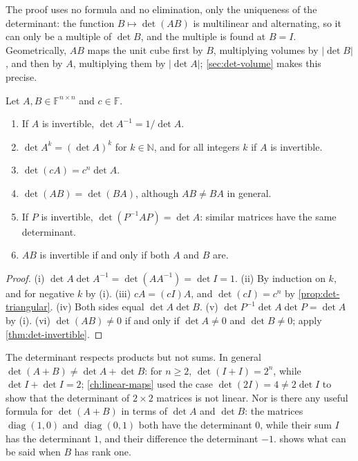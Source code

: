 The proof uses no formula and no elimination, only the uniqueness of the determinant: the function $B\mapsto\det(AB)$ is multilinear and alternating, so it can only be a multiple of $\det B$, and the multiple is found at $B=I$. Geometrically, $AB$ maps the unit cube first by $B$, multiplying volumes by $|\det B|$, and then by $A$, multiplying them by $|\det A|$; \cref{sec:det-volume} makes this precise.

\begin{corollary}
\label{cor:det-product}
Let $A,B\in\mathbb F^{n\times n}$ and $c\in\mathbb F$.
\begin{enumerate}
\item If $A$ is invertible, $\det A^{-1}=1/\det A$.
\item $\det A^k=(\det A)^k$ for $k\in\mathbb N$, and for all integers $k$ if $A$ is invertible.
\item $\det(cA)=c^n\det A$.
\item $\det(AB)=\det(BA)$, although $AB\ne BA$ in general.
\item If $P$ is invertible, $\det(P^{-1}AP)=\det A$: similar matrices have the same determinant.
\item $AB$ is invertible if and only if both $A$ and $B$ are.
\end{enumerate}
\end{corollary}

\begin{proof}
(i) $\det A\det A^{-1}=\det(AA^{-1})=\det I=1$. (ii) By induction on $k$, and for negative $k$ by (i). (iii) $cA=(cI)A$, and $\det(cI)=c^n$ by \cref{prop:det-triangular}. (iv) Both sides equal $\det A\det B$. (v) $\det P^{-1}\det A\det P=\det A$ by (i). (vi) $\det(AB)\ne0$ if and only if $\det A\ne0$ and $\det B\ne0$; apply \cref{thm:det-invertible}.
\end{proof}

The determinant respects products but not sums. In general $\det(A+B)\ne\det A+\det B$: for $n\ge2$, $\det(I+I)=2^n$, while $\det I+\det I=2$; \cref{ch:linear-maps} used the case $\det(2I)=4\ne2\det I$ to show that the determinant of $2\times2$ matrices is not linear. Nor is there any useful formula for $\det(A+B)$ in terms of $\det A$ and $\det B$: the matrices $\operatorname{diag}(1,0)$ and $\operatorname{diag}(0,1)$ both have the determinant $0$, while their sum $I$ has the determinant $1$, and their difference the determinant $-1$.  shows what can be said when $B$ has rank one.

